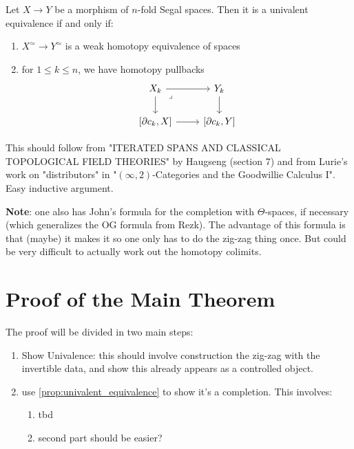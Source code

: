 \documentclass{article}
\begin{document}
\begin{proposition}\label{prop:univalent_equivalence}
    Let $X \to Y$ be a morphism of $n$-fold Segal spaces.
    Then it is a univalent equivalence if and only if:
    \begin{enumerate}
        \item $X^\simeq \to Y^\simeq$ is a weak homotopy equivalence of spaces
        \item for $1 \leq k \leq n$, we have homotopy pullbacks
        \begin{equation}\label{eq:k-morphism-spaces}
            \begin{tikzcd}
                {X_k} & {Y_k} \\
                {[\partial c_k, X]} & {[\partial c_k, Y]}
                \arrow[from=1-1, to=1-2]
                \arrow[from=1-1, to=2-1]
                \arrow["\lrcorner"{anchor=center, pos=0.125}, draw=none, from=1-1, to=2-2]
                \arrow[from=1-2, to=2-2]
                \arrow[from=2-1, to=2-2]
            \end{tikzcd}
        \end{equation}
    \end{enumerate}
\end{proposition}

This should follow from "ITERATED SPANS AND CLASSICAL TOPOLOGICAL FIELD THEORIES" by Haugseng (section 7) and from Lurie's work on "distributors" in "$(\infty,2)$-Categories and the Goodwillie Calculus I".
Easy inductive argument.

\textbf{Note}: one also has John's formula for the completion with $\Theta$-spaces, if necessary (which generalizes the OG formula from Rezk).
The advantage of this formula is that (maybe) it makes it so one only has to do the zig-zag thing once.
But could be very difficult to actually work out the homotopy colimits.

\section{Proof of the Main Theorem}

\begin{remark}
    The proof will be divided in two main steps:
    \begin{enumerate}
    \item Show Univalence: this should involve construction the zig-zag with the invertible data, and show this already appears as a controlled object.
    \item use \autoref{prop:univalent_equivalence} to show it's a completion. This involves:
    \begin{enumerate}
        \item tbd
        \item second part should be easier?
    \end{enumerate}
\end{enumerate}
\end{remark}
\end{document}
